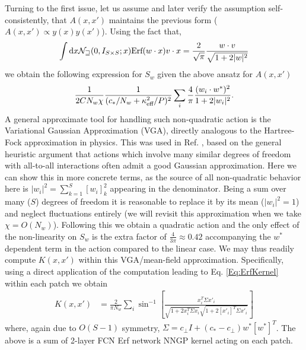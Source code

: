 Turning to the first issue, let us assume and later verify the assumption self-consistently, that $A(x,x')$ maintains the previous form ($A(x,x') \propto y(x) y(x')$). Using the fact that, 
\begin{align}
\label{Eq:Useful_Integral}
\int \text{d} x {\cal N_w}(0,I_{S\times S};x) \text{Erf}({w} \cdot x) {v}\cdot x= \frac{2}{\sqrt{\pi}} \frac{{w} \cdot {v}}{\sqrt{1+2|{w}|^2}}
\end{align}
we obtain the following expression for $S_w$ given the above ansatz for $A(x,x')$
\begin{align}
\frac{1}{2CN_w \chi} \frac{1}{(c_*/N_w+\kappa^2_{\text{eff}}/P)^2} \sum_i \frac{4}{\pi} \frac{({w}_i \cdot {w}^*)^2}{1+2|{w}_i|^2}.
\end{align}
A general approximate tool for handling such non-quadratic action is the Variational Gaussian Approximation (VGA), directly analogous to the Hartree-Fock approximation in physics. This was used in Ref. \cite{seroussi2023separation}, based on the general heuristic argument that actions which involve many similar degrees of freedom with all-to-all interactions often admit a good Gaussian approximation. Here we can show this in more concrete terms, as the source of all non-quadratic behavior here is $|{w}_i|^2=\sum_{k=1}^S [{w}_i]_k^2$ appearing in the denominator. Being a sum over many ($S$) degrees of freedom it is reasonable to replace it by its mean ($|{w}_i|^2=1$) and neglect fluctuations entirely (we will revisit this approximation when we take $\chi = O(N_w)$). Following this we obtain a quadratic action and the only effect of the non-linearity on $S_w$ is the extra factor of $\frac{4}{3\pi} \approx 0.42$ accompanying the ${w}^*$ dependent term in the action compared to the linear case. We may thus readily compute $K(x,x')$ within this VGA/mean-field approximation. Specifically, using a direct application of the computation leading to Eq. \ref{Eq:ErfKernel} within each patch we obtain 
\begin{align}
K(x,x') &= \frac{2}{\pi N_w} \sum_i \sin^{-1} \left[\frac{{x}^T_i \Sigma {x}'_i}{\sqrt{1+2 {x}_i^T \Sigma {x}_i}\sqrt{1+2 [{x}'_i]^T \Sigma {x}'_i}} \right] 
\end{align}
where, again due to $O(S-1)$ symmetry, $\Sigma = c_{\perp}I + (c_*-c_{\perp}) {w}^* [{w}^*]^T$. The above is a sum of 2-layer FCN Erf network NNGP kernel acting on each patch. 

